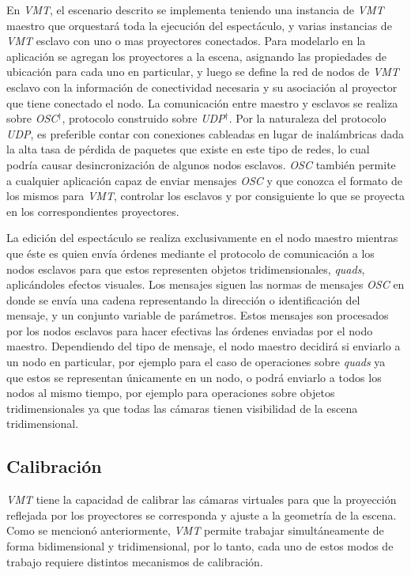 En \emph{VMT}, el escenario descrito se implementa teniendo una instancia de \emph{VMT} maestro que orquestará toda la ejecución del espectáculo, y varias instancias de \emph{VMT} esclavo con uno o mas proyectores conectados. Para modelarlo en la aplicación se agregan los proyectores a la escena, asignando las propiedades de ubicación para cada uno en particular, y luego se define la red de nodos de \emph{VMT} esclavo con la información de conectividad necesaria y su asociación al proyector que tiene conectado el nodo. La comunicación entre maestro y esclavos se realiza sobre \emph{OSC}$^\dagger$, protocolo construido sobre \emph{UDP}$^\dagger$. Por la naturaleza del protocolo \emph{UDP}, es preferible contar con conexiones cableadas en lugar de inalámbricas dada la alta tasa de pérdida de paquetes que existe en este tipo de redes, lo cual podría causar desincronización de algunos nodos esclavos. \emph{OSC} también permite a cualquier aplicación capaz de enviar mensajes \emph{OSC} y que conozca el formato de los mismos para \emph{VMT}, controlar los esclavos y por consiguiente lo que se proyecta en los correspondientes proyectores.

La edición del espectáculo se realiza exclusivamente en el nodo maestro mientras que éste es quien envía órdenes mediante el protocolo de comunicación a los nodos esclavos para que estos representen objetos tridimensionales, \emph{quads}, aplicándoles efectos visuales.
Los mensajes siguen las normas de mensajes \emph{OSC} en donde se envía una cadena representando la dirección o identificación del mensaje, y un conjunto variable de parámetros.
Estos mensajes son procesados por los nodos esclavos para hacer efectivas las órdenes enviadas por el nodo maestro.
Dependiendo del tipo de mensaje, el nodo maestro decidirá si enviarlo a un nodo en particular, por ejemplo para el caso de operaciones sobre \emph{quads} ya que estos se representan únicamente en un nodo, o podrá enviarlo a todos los nodos al mismo tiempo, por ejemplo para operaciones sobre objetos tridimensionales ya que todas las cámaras tienen visibilidad de la escena tridimensional.

\subsection{Calibración}

\emph{VMT} tiene la capacidad de calibrar las cámaras virtuales para que la proyección reflejada por los proyectores se corresponda y ajuste a la geometría de la escena.
Como se mencionó anteriormente, \emph{VMT} permite trabajar simultáneamente de forma bidimensional y tridimensional, por lo tanto, cada uno de estos modos de trabajo requiere distintos mecanismos de calibración.

